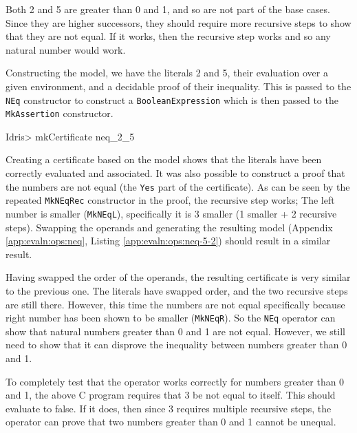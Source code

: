         Both 2 and 5 are greater than 0 and 1, and so are not part of the base cases. Since they are higher successors, they should require more recursive steps to show that they are not equal. If it works, then the recursive step works and so any natural number would work.
        
        
        Constructing the model, we have the literals 2 and 5, their evaluation over a given environment, and a decidable proof of their inequality. This is passed to the \texttt{NEq} constructor to construct a \texttt{BooleanExpression} which is then passed to the \texttt{MkAssertion} constructor.
        
        \begin{code}
Idris> mkCertificate neq_2_5
        \end{code}
        
        Creating a certificate based on the model shows that the literals have been correctly evaluated and associated. It was also possible to construct a proof that the numbers are not equal (the \texttt{Yes} part of the certificate). As can be seen by the repeated \texttt{MkNEqRec} constructor in the proof, the recursive step works; The left number is smaller (\texttt{MkNEqL}), specifically it is 3 smaller (1 smaller + 2 recursive steps). Swapping the operands and generating the resulting model (Appendix \ref{app:evaln:ops:neq}, Listing \ref{app:evaln:ops:neq-5-2}) should result in a similar result.
        
        
        Having swapped the order of the operands, the resulting certificate is very similar to the previous one. The literals have swapped order, and the two recursive steps are still there. However, this time the numbers are not equal specifically because right number has been shown to be smaller (\texttt{MkNEqR}). So the \texttt{NEq} operator can show that natural numbers greater than 0 and 1 are not equal. However, we still need to show that it can disprove the inequality between numbers greater than 0 and 1.
        
        
        
        To completely test that the operator works correctly for numbers greater than 0 and 1, the above C program requires that 3 be not equal to itself. This should evaluate to false. If it does, then since 3 requires multiple recursive steps, the operator can prove that two numbers greater than 0 and 1 cannot be unequal.
        
